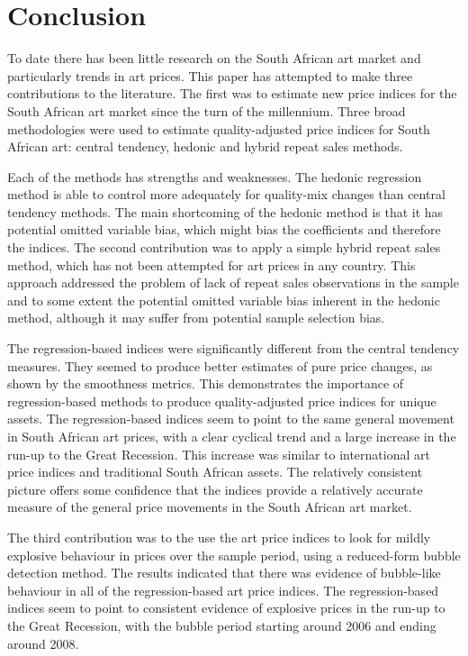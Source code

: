 \documentclass[12pt,]{article}
\begin{document}
\section{Conclusion}\label{conclusion}

To date there has been little research on the South African art market
and particularly trends in art prices. This paper has attempted to make
three contributions to the literature. The first was to estimate new
price indices for the South African art market since the turn of the
millennium. Three broad methodologies were used to estimate
quality-adjusted price indices for South African art: central tendency,
hedonic and hybrid repeat sales methods.

Each of the methods has strengths and weaknesses. The hedonic regression
method is able to control more adequately for quality-mix changes than
central tendency methods. The main shortcoming of the hedonic method is
that it has potential omitted variable bias, which might bias the
coefficients and therefore the indices. The second contribution was to
apply a simple hybrid repeat sales method, which has not been attempted
for art prices in any country. This approach addressed the problem of
lack of repeat sales observations in the sample and to some extent the
potential omitted variable bias inherent in the hedonic method, although
it may suffer from potential sample selection bias.

The regression-based indices were significantly different from the
central tendency measures. They seemed to produce better estimates of
pure price changes, as shown by the smoothness metrics. This
demonstrates the importance of regression-based methods to produce
quality-adjusted price indices for unique assets. The regression-based
indices seem to point to the same general movement in South African art
prices, with a clear cyclical trend and a large increase in the run-up
to the Great Recession. This increase was similar to international art
price indices and traditional South African assets. The relatively
consistent picture offers some confidence that the indices provide a
relatively accurate measure of the general price movements in the South
African art market.

The third contribution was to the use the art price indices to look for
mildly explosive behaviour in prices over the sample period, using a
reduced-form bubble detection method. The results indicated that there
was evidence of bubble-like behaviour in all of the regression-based art
price indices. The regression-based indices seem to point to consistent
evidence of explosive prices in the run-up to the Great Recession, with
the bubble period starting around 2006 and ending around 2008.
\end{document}
